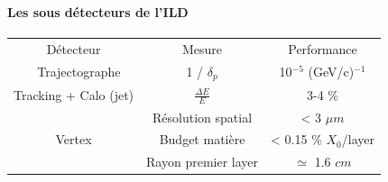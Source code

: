 \documentclass[8pt]{beamer}
\begin{document}
  \begin{frame}
  \frametitle{\secname}
  \framesubtitle{Les sous détecteurs de l'ILD}
    \begin{minipage}{0.62\linewidth}
      \begin{table}
        \begin{tabular}{c|c|c}
          \hline
          \multicolumn{1}{c}{Détecteur} & \multicolumn{1}{c}{Mesure} & \multicolumn{1}{c}{Performance} \\ 
          \hline \hline
          Trajectographe & 1 / $\delta_p$                           & 10$^{-5}$ (GeV/c)$^{-1}$ \\
          Tracking + Calo (jet)   & $\frac{\Delta E}{E}$                     & 3-4 \% \\
          \multirow{3}{*}{Vertex}         & {\footnotesize Résolution spatial}       & {\footnotesize < 3 $\mu m$} \\
          ~              & {\footnotesize Budget matière}           & {\footnotesize < 0.15 \% $X_{0}$/layer} \\
          ~              & {\footnotesize Rayon premier layer}      & {\footnotesize $\simeq$ 1.6 $cm$}
        \end{tabular}
      \end{table}
    \end{minipage} \hfill
    \begin{minipage}{0.36\linewidth}
\end{minipage}
\end{frame}
\end{document}
